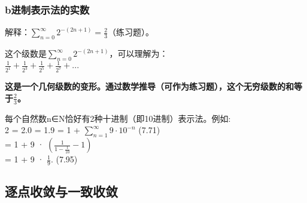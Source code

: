 \documentclass[a4paper,12pt]{article}
\begin{document}
\subsubsection{b进制表示法的实数}\label{bux8fdbux5236ux8868ux793aux6cd5ux7684ux5b9eux6570}

解释：\(\sum_{n=0}^{\infty} 2^{-(2n+1)} = \frac{2}{3}\)（练习题）。

这个级数是\(\sum_{n=0}^{\infty} 2^{-(2n+1)}\)，可以理解为：\\
\(\frac{1}{2^1} + \frac{1}{2^3} + \frac{1}{2^5} + \frac{1}{2^7} + ...\)

\textbf{这是一个几何级数的变形。通过数学推导（可作为练习题），这个无穷级数的和等于\(\frac{2}{3}\)。}

每个自然数n∈N恰好有2种十进制（即10进制）表示法。例如:\\
2 = 2.0 = 1.9 = 1 + \(\sum_{n=1}^{\infty} 9 \cdot 10^{-n}\) (7.71)\\
= 1 + 9 · \(\left(\frac{1}{1 - \frac{1}{10}} - 1\right)\)\\
= 1 + 9 · \(\frac{1}{9}\). (7.95)

\subsection{逐点收敛与一致收敛}\label{ux9010ux70b9ux6536ux655bux4e0eux4e00ux81f4ux6536ux655b}
\end{document}
